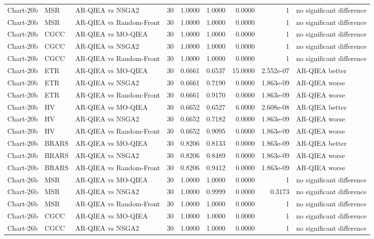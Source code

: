 \begin{tabular}{lllrrrrrl}
Chart-20b & MSR & AR-QIEA vs NSGA2 & 30 & 1.0000 & 1.0000 & 0.0000 & 1 & no significant difference \\
Chart-20b & MSR & AR-QIEA vs Random-Front & 30 & 1.0000 & 1.0000 & 0.0000 & 1 & no significant difference \\
Chart-20b & CGCC & AR-QIEA vs MO-QIEA & 30 & 1.0000 & 1.0000 & 0.0000 & 1 & no significant difference \\
Chart-20b & CGCC & AR-QIEA vs NSGA2 & 30 & 1.0000 & 1.0000 & 0.0000 & 1 & no significant difference \\
Chart-20b & CGCC & AR-QIEA vs Random-Front & 30 & 1.0000 & 1.0000 & 0.0000 & 1 & no significant difference \\
Chart-20b & ETR & AR-QIEA vs MO-QIEA & 30 & 0.6661 & 0.6537 & 15.0000 & 2.552e-07 & AR-QIEA better \\
Chart-20b & ETR & AR-QIEA vs NSGA2 & 30 & 0.6661 & 0.7190 & 0.0000 & 1.863e-09 & AR-QIEA worse \\
Chart-20b & ETR & AR-QIEA vs Random-Front & 30 & 0.6661 & 0.9170 & 0.0000 & 1.863e-09 & AR-QIEA worse \\
Chart-20b & HV & AR-QIEA vs MO-QIEA & 30 & 0.6652 & 0.6527 & 6.0000 & 2.608e-08 & AR-QIEA better \\
Chart-20b & HV & AR-QIEA vs NSGA2 & 30 & 0.6652 & 0.7182 & 0.0000 & 1.863e-09 & AR-QIEA worse \\
Chart-20b & HV & AR-QIEA vs Random-Front & 30 & 0.6652 & 0.9095 & 0.0000 & 1.863e-09 & AR-QIEA worse \\
Chart-20b & BRARS & AR-QIEA vs MO-QIEA & 30 & 0.8206 & 0.8133 & 0.0000 & 1.863e-09 & AR-QIEA better \\
Chart-20b & BRARS & AR-QIEA vs NSGA2 & 30 & 0.8206 & 0.8489 & 0.0000 & 1.863e-09 & AR-QIEA worse \\
Chart-20b & BRARS & AR-QIEA vs Random-Front & 30 & 0.8206 & 0.9412 & 0.0000 & 1.863e-09 & AR-QIEA worse \\
Chart-26b & MSR & AR-QIEA vs MO-QIEA & 30 & 1.0000 & 1.0000 & 0.0000 & 1 & no significant difference \\
Chart-26b & MSR & AR-QIEA vs NSGA2 & 30 & 1.0000 & 0.9999 & 0.0000 & 0.3173 & no significant difference \\
Chart-26b & MSR & AR-QIEA vs Random-Front & 30 & 1.0000 & 1.0000 & 0.0000 & 1 & no significant difference \\
Chart-26b & CGCC & AR-QIEA vs MO-QIEA & 30 & 1.0000 & 1.0000 & 0.0000 & 1 & no significant difference \\
Chart-26b & CGCC & AR-QIEA vs NSGA2 & 30 & 1.0000 & 1.0000 & 0.0000 & 1 & no significant difference \\

\end{tabular}
